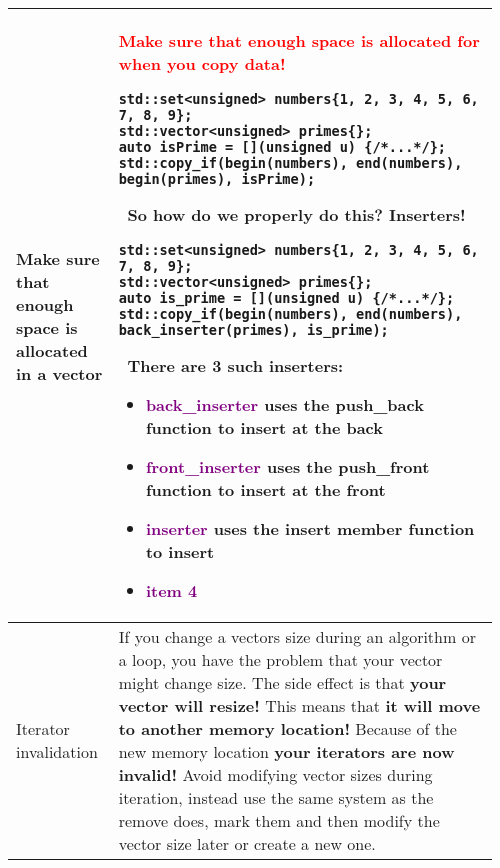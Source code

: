 \documentclass[main.tex,fontsize=8pt,paper=a4,paper=portrait,DIV=calc,]{scrartcl}
\begin{document}
\begin{table}[ht!]
\begin{tabular}{|m{0.2\linewidth}|m{0.755\linewidth}|}
\hline
Make sure that enough space is allocated in a vector & 
\textcolor{red}{Make sure that enough space is allocated for when you copy data!}\newline
\begin{lstlisting}
std::set<unsigned> numbers{1, 2, 3, 4, 5, 6, 7, 8, 9};
std::vector<unsigned> primes{};
auto isPrime = [](unsigned u) {/*...*/};
std::copy_if(begin(numbers), end(numbers), begin(primes), isPrime);
\end{lstlisting}
\, \newline
So how do we properly do this? \textbf{Inserters!}\newline
\begin{lstlisting}
std::set<unsigned> numbers{1, 2, 3, 4, 5, 6, 7, 8, 9};
std::vector<unsigned> primes{};
auto is_prime = [](unsigned u) {/*...*/};
std::copy_if(begin(numbers), end(numbers), back_inserter(primes), is_prime);
\end{lstlisting}
\, \newline
There are 3 such inserters:\newline
\begin{itemize}
\item \textcolor{purple}{back\_inserter}\newline
  uses the \textbf{push\_back function} to insert at the back
\item \textcolor{purple}{front\_inserter}\newline
  uses the \textbf{push\_front function} to insert at the front
\item \textcolor{purple}{inserter}\newline
  uses the \textbf{insert member} function to insert
\item \textcolor{purple}{item 4}
\vspace{-3mm}
\end{itemize} \\
\hline
Iterator invalidation & 
If you change a vectors size during an algorithm or a loop, you have the problem that your vector might change size. \newline
The side effect is that \textbf{your vector will resize!} This means that \textbf{it will move to another memory location!}\newline
Because of the new memory location \textbf{your iterators are now invalid!}\newline
Avoid modifying vector sizes during iteration, instead use the same system as the remove does, mark them and then modify the vector size later or create a new one.\\

\end{tabular}
\end{table}
\end{document}
